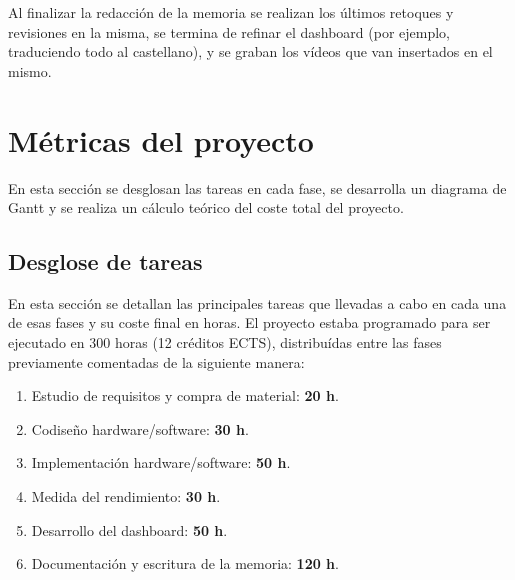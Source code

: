 Al finalizar la redacción de la memoria se realizan los últimos retoques y revisiones en la misma, se termina de refinar el dashboard (por ejemplo, traduciendo todo al castellano), y se graban los vídeos que van insertados en el mismo.

\section{Métricas del proyecto}
En esta sección se desglosan las tareas en cada fase, se desarrolla un diagrama de Gantt y se realiza un cálculo teórico del coste total del proyecto.

\subsection{Desglose de tareas}
En esta sección se detallan las principales tareas que llevadas a cabo en cada una de esas fases y su coste final en horas. El proyecto estaba programado para ser ejecutado en  300 horas (12 créditos ECTS), distribuídas entre las fases previamente comentadas de la siguiente manera:

\begin{enumerate}
  \item Estudio de requisitos y compra de material: \textbf{20 h}.
  \item Codiseño hardware/software: \textbf{30 h}.
  \item Implementación hardware/software: \textbf{50 h}.
  \item Medida del rendimiento: \textbf{30 h}.
  \item Desarrollo del dashboard: \textbf{50 h}.
  \item Documentación y escritura de la memoria: \textbf{120 h}.
\end{enumerate}


